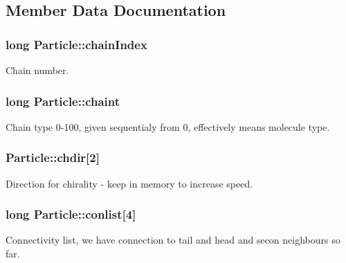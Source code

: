 \subsection{Member Data Documentation}
\hypertarget{class_particle_a9b75fd3fa9351d7d3fd7aa5a5170a809}{
\subsubsection[{chain\+Index}]{\setlength{\rightskip}{0pt plus 5cm}long Particle\+::chain\+Index}}\label{class_particle_a9b75fd3fa9351d7d3fd7aa5a5170a809}


Chain number. 

\hypertarget{class_particle_a0ca4fb9c64dddcda93acc502767f7432}{
\subsubsection[{chaint}]{\setlength{\rightskip}{0pt plus 5cm}long Particle\+::chaint}}\label{class_particle_a0ca4fb9c64dddcda93acc502767f7432}


Chain type 0-\/100, given sequentialy from 0, effectively means molecule type. 

\hypertarget{class_particle_adb1225ad15e081be7534279d63bcdf94}{
\subsubsection[{chdir}]{ Particle\+::chdir\mbox{[}2\mbox{]}}}\label{class_particle_adb1225ad15e081be7534279d63bcdf94}


Direction for chirality -\/ keep in memory to increase speed. 

\hypertarget{class_particle_aea82d73fc279e2b1d9d837e6a0873b30}{
\subsubsection[{conlist}]{\setlength{\rightskip}{0pt plus 5cm}long Particle\+::conlist\mbox{[}4\mbox{]}}}\label{class_particle_aea82d73fc279e2b1d9d837e6a0873b30}


Connectivity list, we have connection to tail and head and secon neighbours so far. 

